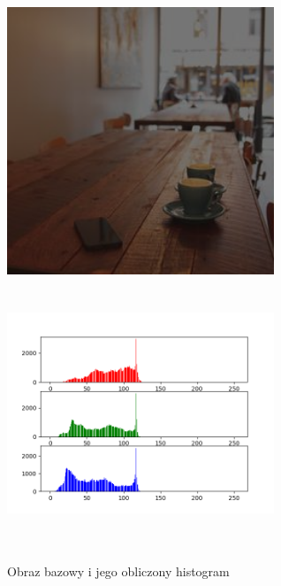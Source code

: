 \documentclass[a4paper,12pt]{book}
\begin{document}
\begin{figure}[H]
	\caption{Obraz bazowy i jego obliczony histogram}
	\includegraphics[width=8cm, height=8cm]{coffee-dark-unmodified.png}
	\includegraphics[width=8cm, height=8cm]{6-1/calculate-coffee-dark.png}
\end{figure}
\end{document}
